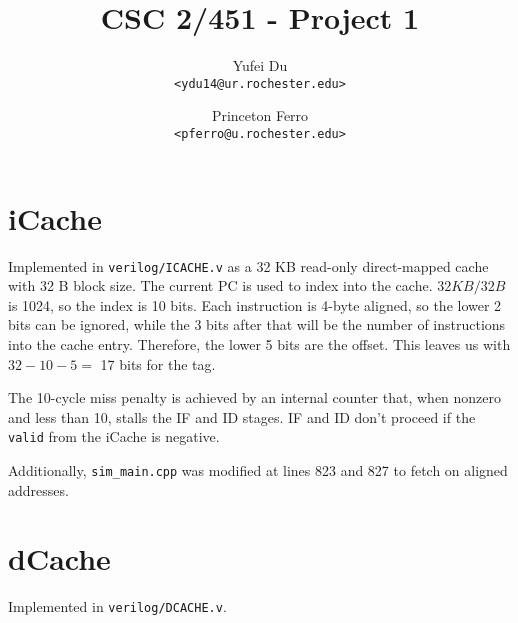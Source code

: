 \documentclass[a4paper,11pt]{article}
\title{CSC 2/451 - Project 1}
\author{
Yufei Du \\
\texttt{<ydu14@ur.rochester.edu>}
\and
Princeton Ferro \\
\texttt{<pferro@u.rochester.edu>}
}
\begin{document}
\maketitle

\section{iCache}
Implemented in \texttt{verilog/ICACHE.v} as a 32 KB read-only direct-mapped cache with 32 B block size. The current PC is used to index into the cache. $ 32KB / 32 B$ is 1024, so the index is 10 bits. Each instruction is 4-byte aligned, so the lower 2 bits can be ignored, while the 3 bits after that will be the number of instructions into the cache entry. Therefore, the lower 5 bits are the offset. This leaves us with $32-10-5 =$ 17 bits for the tag.

The 10-cycle miss penalty is achieved by an internal counter that, when nonzero and less than 10, stalls the IF and ID stages. IF and ID don't proceed if the \texttt{valid} from the iCache is negative.

Additionally, \texttt{sim\_main.cpp} was modified at lines 823 and 827 to fetch on aligned addresses.

\section{dCache}
Implemented in \texttt{verilog/DCACHE.v}.
\end{document}
